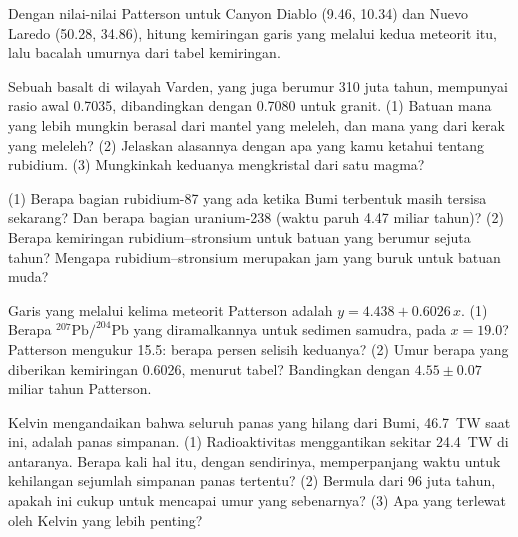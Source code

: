\begin{exercise}[$\star\star$]\label{exo:g12:age-of-the-earth:11}
Dengan nilai-nilai Patterson untuk Canyon Diablo (9.46, 10.34) dan Nuevo Laredo
(50.28, 34.86), hitung kemiringan garis yang melalui kedua meteorit itu, lalu
bacalah umurnya dari tabel kemiringan.
\end{exercise}

\begin{exercise}[$\star\star\star$]\label{exo:g12:age-of-the-earth:12}
Sebuah basalt di wilayah Varden, yang juga berumur 310 juta tahun, mempunyai
rasio awal 0.7035, dibandingkan dengan 0.7080 untuk granit. (1) Batuan mana
yang lebih mungkin berasal dari mantel yang meleleh, dan mana yang dari kerak
yang meleleh? (2) Jelaskan alasannya dengan apa yang kamu ketahui tentang
rubidium. (3) Mungkinkah keduanya mengkristal dari satu magma?
\end{exercise}

\begin{exercise}[$\star\star\star$]\label{exo:g12:age-of-the-earth:13}
(1) Berapa bagian rubidium-87 yang ada ketika Bumi terbentuk masih tersisa
sekarang? Dan berapa bagian uranium-238 (waktu paruh 4.47 miliar tahun)?
(2) Berapa kemiringan  rubidium--stronsium untuk batuan yang berumur
sejuta tahun? Mengapa rubidium--stronsium merupakan jam yang buruk untuk batuan
muda?
\end{exercise}

\begin{exercise}[$\star\star\star$]\label{exo:g12:age-of-the-earth:14}
Garis yang melalui kelima meteorit Patterson adalah $y = 4.438 + 0.6026\,x$.
(1) Berapa $^{207}\mathrm{Pb}/^{204}\mathrm{Pb}$ yang diramalkannya untuk
sedimen samudra, pada $x = 19.0$? Patterson mengukur 15.5: berapa persen
selisih keduanya? (2) Umur berapa yang diberikan kemiringan 0.6026, menurut
tabel? Bandingkan dengan $4.55 \pm 0.07$ miliar tahun Patterson.
\end{exercise}

\begin{exercise}[$\star\star\star$]\label{exo:g12:age-of-the-earth:15}
Kelvin mengandaikan bahwa seluruh panas yang hilang dari Bumi, \qty{46.7}{TW}
saat ini, adalah panas simpanan. (1) Radioaktivitas menggantikan sekitar
\qty{24.4}{TW} di antaranya. Berapa kali hal itu, dengan sendirinya,
memperpanjang waktu untuk kehilangan sejumlah simpanan panas tertentu?
(2) Bermula dari 96 juta tahun, apakah ini cukup untuk mencapai umur yang
sebenarnya? (3) Apa yang terlewat oleh Kelvin yang lebih penting?
\end{exercise}


